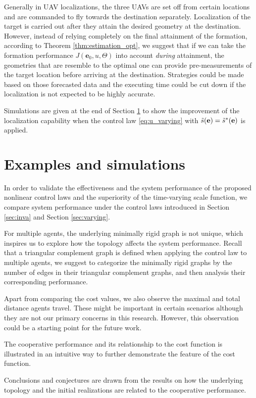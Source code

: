 \documentclass[times]{rncauth}
\newcommand{\be}{\ensuremath \mathbf{e}}
\begin{document}
Generally in UAV localizations, the three UAVs are set off from
certain locations and are commanded to fly towards the destination
separately. Localization of the target is carried out after they
attain the desired geometry at the destination. However, instead of
relying completely on the final attainment of the formation,
according to Theorem \ref{thm:estimation_opt}, we suggest that if we
can take the formation performance $J(\mathbf{e}_0,u,\Theta)$ into
account \emph{during} attainment, the geometries that are resemble to
the optimal one can provide pre-measurements of the target location
before arriving at the destination. Strategies could be made based
on those forecasted data and the executing time could be cut down if
the localization is not expected to be highly accurate.

Simulations are given at the end of Section \ref{sec:exp} to show
the improvement of the localization capability when the control law
\eqref{eq:u_varying} with $\tilde{s}(\be)=\tilde{s}^*(\be)$ is
applied.

\section{Examples and simulations}\label{sec:exp}
In order to validate the effectiveness and the system performance of
the proposed nonlinear control laws and the superiority of the
time-varying scale function, we compare system performance under the
control laws introduced in Section \ref{sec:inva} and Section
\ref{sec:varying}.

For multiple agents, the underlying  minimally rigid graph is not
unique, which inspires us to explore how the topology affects the
system performance. Recall that a triangular complement graph is
defined when applying the control law to multiple agents, we suggest
to categorize the minimally rigid graphs by the number of edges in
their
 triangular complement graphs, and then analysis their corresponding performance.

Apart from comparing the cost values, we also observe the maximal
and total distance agents travel. These might be important in
certain scenarios although they are not our primary concerns in this
research. However, this observation could be a starting point for
the future work.

The cooperative performance and its relationship to the cost
function is illustrated in an intuitive way  to further demonstrate
the feature of the cost function.

Conclusions and conjectures are drawn from the results on how the
underlying topology and the initial realizations are related to the
cooperative performance.
\end{document}
